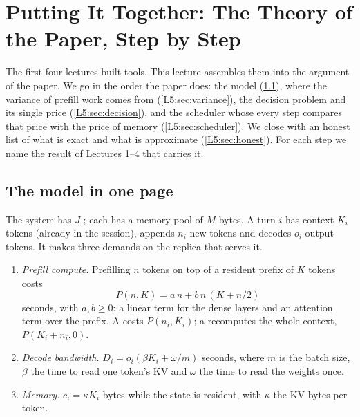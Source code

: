 \chapter{Putting It Together: The Theory of the Paper, Step by Step}\label{sec:L5}

The first four lectures built tools. This lecture assembles them into the
argument of the paper. We go in the order the paper does: the model
(\cref{L5:sec:model}), where the variance of prefill work comes from
(\cref{L5:sec:variance}), the decision problem and its single price
(\cref{L5:sec:decision}), and the scheduler whose every step compares that
price with the price of memory (\cref{L5:sec:scheduler}). We close with an
honest list of what is exact and what is approximate
(\cref{L5:sec:honest}). For each step we name the result of Lectures 1--4
that carries it.

\section{The model in one page}\label{L5:sec:model}

\begin{definition}\label{L5:def:replica}
The system has $J$ ; each has a memory pool of $M$ bytes.
A turn $i$ has context $K_i$ tokens (already in the session), appends $n_i$
new tokens and decodes $o_i$ output tokens. It makes three demands on the
replica that serves it.
\begin{enumerate}[label=(\alph*)]
\item \emph{Prefill compute.} Prefilling $n$ tokens on top of a resident
  prefix of $K$ tokens costs
  \begin{equation}\label{L5:eq:prefill}
    P(n,K)=a\,n+b\,n\,(K+n/2)
  \end{equation}
  seconds, with $a,b\ge0$: a linear term for the dense layers and an
  attention term over the prefix. A  costs $P(n_i,K_i)$; a
   recomputes the whole context, $P(K_i+n_i,0)$.
\item \emph{Decode bandwidth.} $D_i=o_i(\beta K_i+\omega/m)$ seconds, where
  $m$ is the batch size, $\beta$ the time to read one token's KV and
  $\omega$ the time to read the weights once.
\item \emph{Memory.} $c_i=\kappa K_i$ bytes while the state is resident,
  with $\kappa$ the KV bytes per token.
\end{enumerate}
\end{definition}

